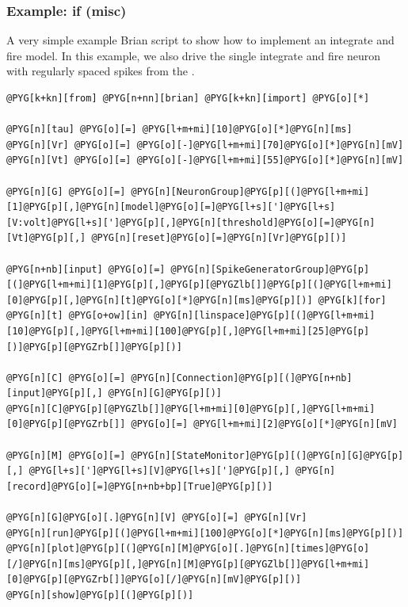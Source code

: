 \documentclass[letterpaper,10pt,english]{manual}
\begin{document}
\hypertarget{index-48}{}\subsubsection{Example: if (misc)}

A very simple example Brian script to show how to implement
an integrate and fire model. In this example, we also
drive the single integrate and fire neuron with
regularly spaced spikes from the \hyperlink{brian.SpikeGeneratorGroup}{}.

\begin{Verbatim}[commandchars=@\[\]]
@PYG[k+kn][from] @PYG[n+nn][brian] @PYG[k+kn][import] @PYG[o][*]

@PYG[n][tau] @PYG[o][=] @PYG[l+m+mi][10]@PYG[o][*]@PYG[n][ms]
@PYG[n][Vr] @PYG[o][=] @PYG[o][-]@PYG[l+m+mi][70]@PYG[o][*]@PYG[n][mV]
@PYG[n][Vt] @PYG[o][=] @PYG[o][-]@PYG[l+m+mi][55]@PYG[o][*]@PYG[n][mV]

@PYG[n][G] @PYG[o][=] @PYG[n][NeuronGroup]@PYG[p][(]@PYG[l+m+mi][1]@PYG[p][,]@PYG[n][model]@PYG[o][=]@PYG[l+s][']@PYG[l+s][V:volt]@PYG[l+s][']@PYG[p][,]@PYG[n][threshold]@PYG[o][=]@PYG[n][Vt]@PYG[p][,] @PYG[n][reset]@PYG[o][=]@PYG[n][Vr]@PYG[p][)]

@PYG[n+nb][input] @PYG[o][=] @PYG[n][SpikeGeneratorGroup]@PYG[p][(]@PYG[l+m+mi][1]@PYG[p][,]@PYG[p][@PYGZlb[]]@PYG[p][(]@PYG[l+m+mi][0]@PYG[p][,]@PYG[n][t]@PYG[o][*]@PYG[n][ms]@PYG[p][)] @PYG[k][for] @PYG[n][t] @PYG[o+ow][in] @PYG[n][linspace]@PYG[p][(]@PYG[l+m+mi][10]@PYG[p][,]@PYG[l+m+mi][100]@PYG[p][,]@PYG[l+m+mi][25]@PYG[p][)]@PYG[p][@PYGZrb[]]@PYG[p][)]

@PYG[n][C] @PYG[o][=] @PYG[n][Connection]@PYG[p][(]@PYG[n+nb][input]@PYG[p][,] @PYG[n][G]@PYG[p][)]
@PYG[n][C]@PYG[p][@PYGZlb[]]@PYG[l+m+mi][0]@PYG[p][,]@PYG[l+m+mi][0]@PYG[p][@PYGZrb[]] @PYG[o][=] @PYG[l+m+mi][2]@PYG[o][*]@PYG[n][mV]

@PYG[n][M] @PYG[o][=] @PYG[n][StateMonitor]@PYG[p][(]@PYG[n][G]@PYG[p][,] @PYG[l+s][']@PYG[l+s][V]@PYG[l+s][']@PYG[p][,] @PYG[n][record]@PYG[o][=]@PYG[n+nb+bp][True]@PYG[p][)]

@PYG[n][G]@PYG[o][.]@PYG[n][V] @PYG[o][=] @PYG[n][Vr]
@PYG[n][run]@PYG[p][(]@PYG[l+m+mi][100]@PYG[o][*]@PYG[n][ms]@PYG[p][)]
@PYG[n][plot]@PYG[p][(]@PYG[n][M]@PYG[o][.]@PYG[n][times]@PYG[o][/]@PYG[n][ms]@PYG[p][,]@PYG[n][M]@PYG[p][@PYGZlb[]]@PYG[l+m+mi][0]@PYG[p][@PYGZrb[]]@PYG[o][/]@PYG[n][mV]@PYG[p][)]
@PYG[n][show]@PYG[p][(]@PYG[p][)]
\end{Verbatim}
\end{document}
